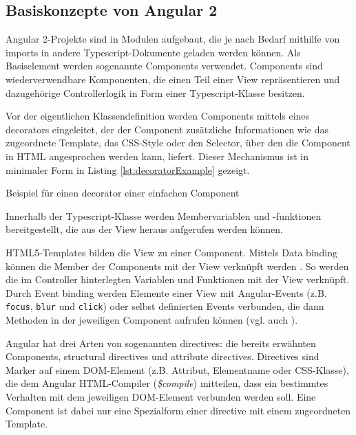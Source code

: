 \subsection{Basiskonzepte von Angular 2}
Angular 2-Projekte sind in Modulen aufgebaut, die je nach Bedarf mithilfe von imports in andere Typescript-Dokumente geladen werden können. Als Basiselement werden sogenannte Components verwendet. Components sind wiederverwendbare Komponenten, die einen Teil einer View repräsentieren und dazugehörige Controllerlogik in Form einer Typescript-Klasse besitzen.

Vor der eigentlichen Klassendefinition werden Components mittels eines decorators eingeleitet, der der Component zusätzliche Informationen wie das zugeordnete Template, das CSS-Style oder den Selector, über den die Component in HTML angesprochen werden kann, liefert. Dieser Mechanismus ist in minimaler Form in Listing \ref{lst:decoratorExample} gezeigt.

\begin{listing}[htb]
    
    \caption{Beispiel für einen decorator einer einfachen Component}
    \label{lst:decoratorExample}
\end{listing}

Innerhalb der Typescript-Klasse werden Membervariablen und -funktionen bereitgestellt, die aus der View heraus aufgerufen werden können.

HTML5-Templates bilden die View zu einer Component. Mittels Data binding können die Member der Components mit der View verknüpft werden \cite{LynchAngularComponents}. So werden die im Controller hinterlegten Variablen und Funktionen mit der View verknüpft. Durch Event binding werden Elemente einer View mit Angular-Events (z.B. \texttt{focus}, \texttt{blur} und \texttt{click}) oder selbst definierten Events verbunden, die dann Methoden in der jeweiligen Component aufrufen können (vgl. auch  \cite{PrechtAngularTemplateSyntax}).

Angular hat drei Arten von sogenannten directives: die bereits erwähnten Components, structural directives und attribute directives. Directives sind Marker auf einem DOM-Element (z.B. Attribut, Elementname oder CSS-Klasse), die dem Angular HTML-Compiler (\emph{\$compile}) mitteilen, dass ein bestimmtes Verhalten mit dem jeweiligen DOM-Element verbunden werden soll. Eine Component ist dabei nur eine Spezialform einer directive mit einem zugeordneten Template.

